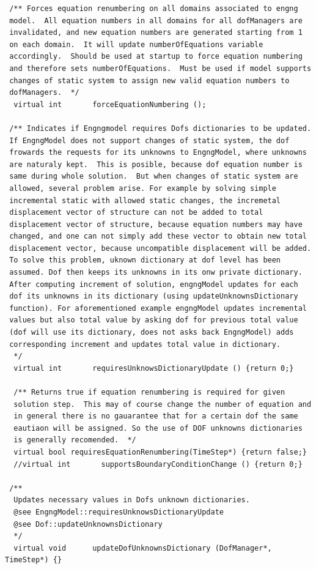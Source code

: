 \documentclass[a4paper]{article}
\begin{document}
{\begin{verbatim}
 /** Forces equation renumbering on all domains associated to engng
 model.  All equation numbers in all domains for all dofManagers are
 invalidated, and new equation numbers are generated starting from 1
 on each domain.  It will update numberOfEquations variable
 accordingly.  Should be used at startup to force equation numbering
 and therefore sets numberOfEquations.  Must be used if model supports
 changes of static system to assign new valid equation numbers to
 dofManagers.  */
  virtual int       forceEquationNumbering ();

 /** Indicates if Engngmodel requires Dofs dictionaries to be updated.
 If EngngModel does not support changes of static system, the dof
 frowards the requests for its unknowns to EngngModel, where unknowns
 are naturaly kept.  This is posible, because dof equation number is
 same during whole solution.  But when changes of static system are
 allowed, several problem arise. For example by solving simple
 incremental static with allowed static changes, the incremetal
 displacement vector of structure can not be added to total
 displacement vector of structure, because equation numbers may have
 changed, and one can not simply add these vector to obtain new total
 displacement vector, because uncompatible displacement will be added.
 To solve this problem, uknown dictionary at dof level has been
 assumed. Dof then keeps its unknowns in its onw private dictionary.
 After computing increment of solution, engngModel updates for each
 dof its unknowns in its dictionary (using updateUnknownsDictionary
 function). For aforementioned example engngModel updates incremental
 values but also total value by asking dof for previous total value
 (dof will use its dictionary, does not asks back EngngModel) adds
 corresponding increment and updates total value in dictionary.
  */
  virtual int       requiresUnknowsDictionaryUpdate () {return 0;}

  /** Returns true if equation renumbering is required for given
  solution step.  This may of course change the number of equation and
  in general there is no gauarantee that for a certain dof the same
  eautiaon will be assigned. So the use of DOF unknowns dictionaries
  is generally recomended.  */
  virtual bool requiresEquationRenumbering(TimeStep*) {return false;}
  //virtual int       supportsBoundaryConditionChange () {return 0;}

 /**
  Updates necessary values in Dofs unknown dictionaries. 
  @see EngngModel::requiresUnknowsDictionaryUpdate
  @see Dof::updateUnknownsDictionary
  */
  virtual void      updateDofUnknownsDictionary (DofManager*, TimeStep*) {}


\end{verbatim}}
\end{document}

